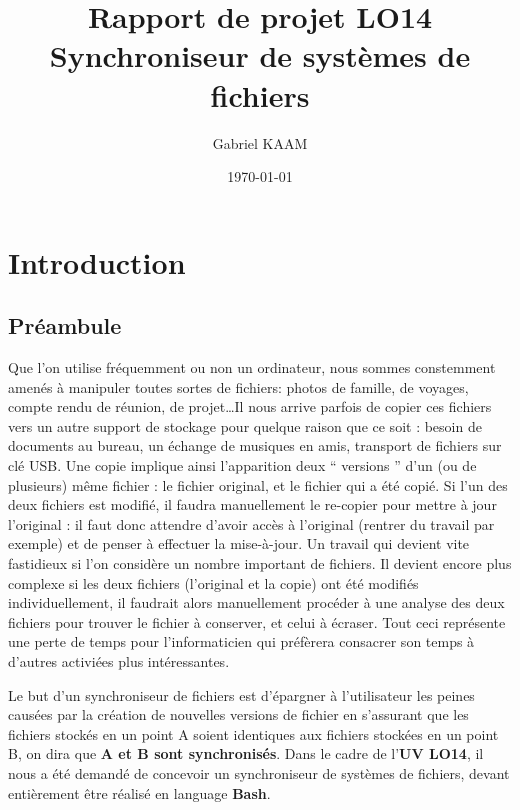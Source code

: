 \documentclass[a4paper,12pt]{report}
\title{Rapport de projet LO14\\Synchroniseur de systèmes de fichiers}
\author{Gabriel KAAM}
\date{\today}
\begin{document}
	\maketitle	
	\tableofcontents
	\chapter{Introduction}
		\section{Préambule}
			\begin{onehalfspace}
				Que l'on utilise fréquemment ou non un ordinateur, nous sommes constemment amenés à manipuler toutes sortes de fichiers: photos de famille, de voyages, compte rendu de réunion, de projet\ldots Il nous arrive parfois de copier ces fichiers vers un autre support de stockage pour quelque raison que ce soit : besoin de documents au bureau, un échange de musiques en amis, transport de fichiers sur clé USB. Une copie implique ainsi l'apparition deux “ versions ” d'un (ou de plusieurs) même fichier : le fichier original, et le fichier qui a été copié.
				Si l'un des deux fichiers est modifié, il faudra manuellement le re-copier pour mettre à jour l'original : il faut donc attendre d'avoir accès à l'original (rentrer du travail par exemple) et de penser à effectuer la mise-à-jour. Un travail qui devient vite fastidieux si l'on considère un nombre important de fichiers. Il devient encore plus complexe si les deux fichiers (l'original et la copie) ont été modifiés individuellement, il faudrait alors manuellement procéder à une analyse des deux fichiers pour trouver le fichier à conserver, et celui à écraser. Tout ceci représente une perte de temps pour l'informaticien qui préfèrera consacrer son temps à d'autres activiées plus intéressantes.

				Le but d'un synchroniseur de fichiers est d'épargner à l'utilisateur les peines causées par la création de nouvelles versions de fichier en s'assurant que les fichiers stockés en un point A soient identiques aux fichiers stockées en un point B, on dira que \textbf{A et B sont synchronisés}. Dans le cadre de l'\textbf{UV LO14}, il nous a été demandé de concevoir un synchroniseur de systèmes de fichiers, devant entièrement être réalisé en language \textbf{Bash}.
			\end{onehalfspace}
			\clearpage
\end{document}
